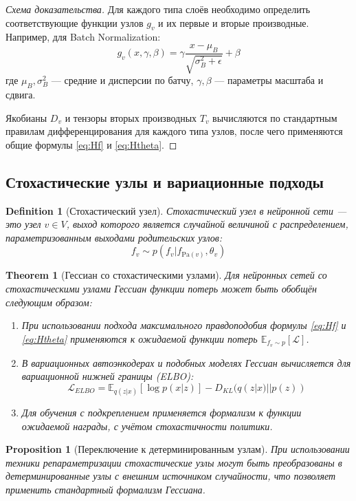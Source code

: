 \documentclass[11pt]{article}
\newtheorem{theorem}{Theorem}
\newtheorem{definition}{Definition}
\newtheorem{proposition}{Proposition}
\newcommand{\Pa}{\mathrm{Pa}} %
\begin{document}
\begin{proof}[Схема доказательства]
  Для каждого типа слоёв необходимо определить соответствующие функции узлов $g_v$ и их первые и вторые
  производные. Например, для Batch Normalization:
  \[
    g_v(x, \gamma, \beta) = \gamma \frac{x - \mu_B}{\sqrt{\sigma_B^2 + \epsilon}} + \beta
  \]
  где $\mu_B, \sigma_B^2$ — средние и дисперсии по батчу, $\gamma, \beta$ — параметры масштаба и сдвига.

  Якобианы $D_v$ и тензоры вторых производных $T_v$ вычисляются по стандартным правилам дифференцирования для
  каждого типа узлов, после чего применяются общие формулы \eqref{eq:Hf} и \eqref{eq:Htheta}.
\end{proof}

\subsection{Стохастические узлы и вариационные подходы}

\begin{definition}[Стохастический узел]
  Стохастический узел в нейронной сети — это узел $v \in V$, выход которого является случайной величиной с
  распределением, параметризованным выходами родительских узлов:
  \[
    f_v \sim p(f_v | f_{\Pa(v)}, \theta_v)
  \]
\end{definition}

\begin{theorem}[Гессиан со стохастическими узлами]
  Для нейронных сетей со стохастическими узлами Гессиан функции потерь может быть обобщён следующим образом:
  \begin{enumerate}
    \item При использовании подхода максимального правдоподобия формулы \eqref{eq:Hf} и \eqref{eq:Htheta}
      применяются к ожидаемой функции потерь $\mathbb{E}_{f_v \sim p}[\mathcal{L}]$.
    \item В вариационных автоэнкодерах и подобных моделях Гессиан вычисляется для вариационной нижней границы (ELBO):
      \[
        \mathcal{L}_{ELBO} = \mathbb{E}_{q(z|x)}[\log p(x|z)] - D_{KL}(q(z|x) || p(z))
      \]
    \item Для обучения с подкреплением применяется формализм к функции ожидаемой награды, с учётом
      стохастичности политики.
  \end{enumerate}
\end{theorem}

\begin{proposition}[Переключение к детерминированным узлам]
  При использовании техники репараметризации стохастические узлы могут быть преобразованы в детерминированные
  узлы с внешним источником случайности, что позволяет применить стандартный формализм Гессиана.
\end{proposition}
\end{document}
